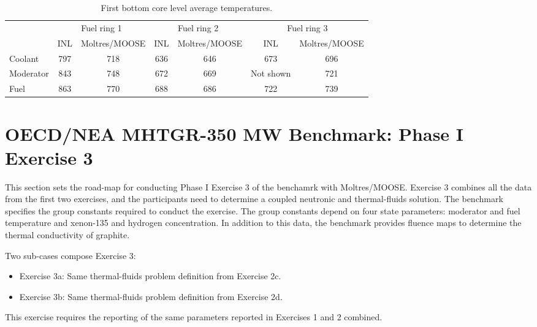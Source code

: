 \begin{table}[htbp!]
\centering
      \caption{First bottom core level average temperatures.}
      \label{tab:th-ex2a-results}
\begin{tabular}{l|c|c|c|c|c|c}
    \toprule
          & \multicolumn{2}{c|}{Fuel ring 1} & \multicolumn{2}{c|}{Fuel ring 2} & \multicolumn{2}{c}{Fuel ring 3} \\ \cline{2-7} 
          & INL     & Moltres/MOOSE     & INL     & Moltres/MOOSE     & INL       & Moltres/MOOSE \\
    \midrule
Coolant   & 797     & 718               & 636     & 646               & 673       & 696           \\
Moderator & 843     & 748               & 672     & 669               & Not shown & 721           \\
Fuel      & 863     & 770               & 688     & 686               & 722       & 739           \\
    \bottomrule
  \end{tabular}
\end{table}

\section{OECD/NEA MHTGR-350 MW Benchmark: Phase I Exercise 3}

This section sets the road-map for conducting Phase I Exercise 3 of the benchamrk with Moltres/MOOSE.
Exercise 3 combines all the data from the first two exercises, and the participants need to determine a coupled neutronic and thermal-fluids solution.
The benchmark specifies the group constants required to conduct the exercise.
The group constants depend on four state parameters: moderator and fuel temperature and xenon-135 and hydrogen concentration.
In addition to this data, the benchmark provides fluence maps to determine the thermal conductivity of graphite.

Two sub-cases compose Exercise 3:
\begin{itemize}
  \item Exercise 3a: Same thermal-fluids problem definition from Exercise 2c.
  \item Exercise 3b: Same thermal-fluids problem definition from Exercise 2d.
\end{itemize}

This exercise requires the reporting of the same parameters reported in Exercises 1 and 2 combined.

